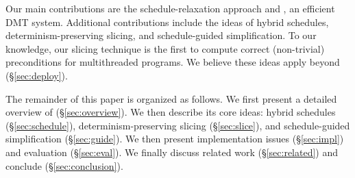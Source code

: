 Our main contributions are the schedule-relaxation approach and \peregrine, an
 efficient DMT system.  Additional contributions include
the ideas of hybrid schedules, determinism-preserving slicing, and
schedule-guided simplification.  To our knowledge, our slicing technique
is the first to compute correct (non-trivial) preconditions for
multithreaded programs.
We believe these ideas apply beyond \peregrine (\S\ref{sec:deploy}).

The remainder of this paper is organized as follows.  We first present a
detailed overview of \peregrine (\S\ref{sec:overview}).  We then describe its
core ideas: hybrid schedules (\S\ref{sec:schedule}),
determinism-preserving slicing (\S\ref{sec:slice}), and schedule-guided
simplification (\S\ref{sec:guide}).  We then present implementation issues
(\S\ref{sec:impl}) and evaluation (\S\ref{sec:eval}).  We finally discuss
related work (\S\ref{sec:related}) and conclude (\S\ref{sec:conclusion}).
